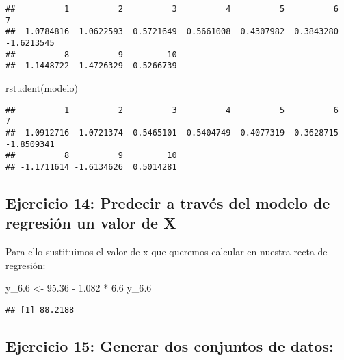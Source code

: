 \documentclass[
]{article}
\newenvironment{Shaded}{\begin{snugshade}}{\end{snugshade}}
\newcommand{\FloatTok}[1]{\textcolor[rgb]{0.00,0.00,0.81}{#1}}
\newcommand{\FunctionTok}[1]{\textcolor[rgb]{0.00,0.00,0.00}{#1}}
\newcommand{\NormalTok}[1]{#1}
\newcommand{\OtherTok}[1]{\textcolor[rgb]{0.56,0.35,0.01}{#1}}
\newcommand{\SpecialCharTok}[1]{\textcolor[rgb]{0.00,0.00,0.00}{#1}}
\begin{document}
\begin{verbatim}
##          1          2          3          4          5          6          7 
##  1.0784816  1.0622593  0.5721649  0.5661008  0.4307982  0.3843280 -1.6213545 
##          8          9         10 
## -1.1448722 -1.4726329  0.5266739
\end{verbatim}

\begin{Shaded}
\begin{Highlighting}[]
\FunctionTok{rstudent}\NormalTok{(modelo)}
\end{Highlighting}
\end{Shaded}

\begin{verbatim}
##          1          2          3          4          5          6          7 
##  1.0912716  1.0721374  0.5465101  0.5404749  0.4077319  0.3628715 -1.8509341 
##          8          9         10 
## -1.1711614 -1.6134626  0.5014281
\end{verbatim}

\hypertarget{ejercicio-14-predecir-a-travuxe9s-del-modelo-de-regresiuxf3n-un-valor-de-x}{%
\subsection{Ejercicio 14: Predecir a través del modelo de regresión un
valor de
X}\label{ejercicio-14-predecir-a-travuxe9s-del-modelo-de-regresiuxf3n-un-valor-de-x}}

Para ello sustituimos el valor de x que queremos calcular en nuestra
recta de regresión:

\begin{Shaded}
\begin{Highlighting}[]
\NormalTok{y\_6}\FloatTok{.6} \OtherTok{\textless{}{-}} \FloatTok{95.36} \SpecialCharTok{{-}} \FloatTok{1.082} \SpecialCharTok{*} \FloatTok{6.6}
\NormalTok{y\_6}\FloatTok{.6}
\end{Highlighting}
\end{Shaded}

\begin{verbatim}
## [1] 88.2188
\end{verbatim}

\hypertarget{ejercicio-15-generar-dos-conjuntos-de-datos}{%
\subsection{Ejercicio 15: Generar dos conjuntos de
datos:}\label{ejercicio-15-generar-dos-conjuntos-de-datos}}
\end{document}

